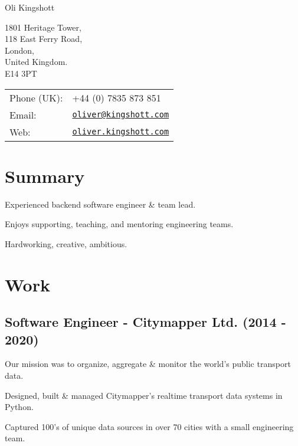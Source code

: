 \documentclass[a4paper]{article}
\def\name{Oli Kingshott}
\renewenvironment{itemize}{
  \begin{list}{}{
    \setlength{\leftmargin}{1.5em}
  }
}{
  \end{list}
}
\begin{document}
{\huge \name}

\vspace{0.25in}

\begin{minipage}{0.45\linewidth}
  1801 Heritage Tower, \\
  118 East Ferry Road, \\
  London, \\
  United Kingdom. \\
  E14 3PT
\end{minipage}
\begin{minipage}{0.45\linewidth}
  \begin{tabular}{ll}
    Phone (UK): & +44 (0) 7835 873 851 \\
    Email: & \href{mailto:oliver@kingshott.com}{\tt oliver@kingshott.com} \\
    Web: & \href{http://oliver.kingshott.com/}{\tt oliver.kingshott.com} \\
  \end{tabular}
\end{minipage}

\section*{Summary}
\begin{itemize}
  \item Experienced backend software engineer \& team lead.
  \item Enjoys supporting, teaching, and mentoring engineering teams.
  \item Hardworking, creative, ambitious.
\end{itemize}

\section*{Work}

\subsection*{Software Engineer - Citymapper Ltd. (2014 - 2020)}
\begin{itemize}
  \item Our mission was to organize, aggregate \& monitor the world's public transport data.
  \item Designed, built \& managed Citymapper's realtime transport data systems in Python.
  \item Captured 100's of unique data sources in over 70 cities with a small engineering team.
\end{itemize}
\end{document}

